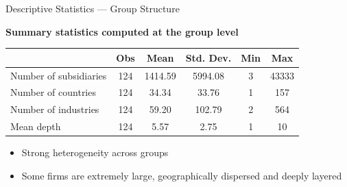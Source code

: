 \documentclass[11pt,aspectratio=169]{beamer}
\begin{document}
  \begin{frame}{Descriptive Statistics --- Group Structure}
  
  \textbf{Summary statistics computed at the group level}
  
  \begin{center}
  \small
  \begin{tabular}{lccccc}
  \toprule
   & Obs & Mean & Std. Dev. & Min & Max \\
  \midrule
  Number of subsidiaries & 124 & 1414.59 & 5994.08 & 3 & 43333 \\
  Number of countries & 124 & 34.34 & 33.76 & 1 & 157 \\
  Number of industries & 124 & 59.20 & 102.79 & 2 & 564 \\
  Mean depth & 124 & 5.57 & 2.75 & 1 & 10 \\
  \bottomrule
  \end{tabular}
  \end{center}
  
  \medskip
  
  \begin{itemize}
      \item Strong heterogeneity across groups
      \item Some firms are extremely large, geographically dispersed and deeply layered
  \end{itemize}
  
  \end{frame}
  
\end{document}
